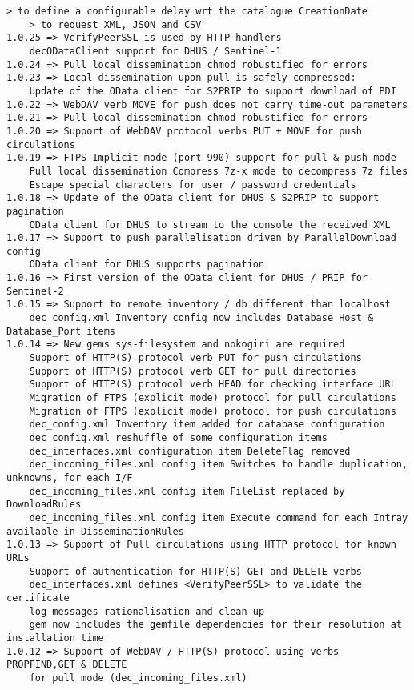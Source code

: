 \documentclass[dec_sum_main.tex]{subfiles}
\begin{document}
\begin{Verbatim}[tabsize=4]
    > to define a configurable delay wrt the catalogue CreationDate
    > to request XML, JSON and CSV
1.0.25 => VerifyPeerSSL is used by HTTP handlers
    decODataClient support for DHUS / Sentinel-1
1.0.24 => Pull local dissemination chmod robustified for errors
1.0.23 => Local dissemination upon pull is safely compressed:
    Update of the OData client for S2PRIP to support download of PDI
1.0.22 => WebDAV verb MOVE for push does not carry time-out parameters
1.0.21 => Pull local dissemination chmod robustified for errors
1.0.20 => Support of WebDAV protocol verbs PUT + MOVE for push circulations
1.0.19 => FTPS Implicit mode (port 990) support for pull & push mode
    Pull local dissemination Compress 7z-x mode to decompress 7z files
    Escape special characters for user / password credentials
1.0.18 => Update of the OData client for DHUS & S2PRIP to support pagination
    OData client for DHUS to stream to the console the received XML
1.0.17 => Support to push parallelisation driven by ParallelDownload config
    OData client for DHUS supports pagination
1.0.16 => First version of the OData client for DHUS / PRIP for Sentinel-2
1.0.15 => Support to remote inventory / db different than localhost
    dec_config.xml Inventory config now includes Database_Host & Database_Port items
1.0.14 => New gems sys-filesystem and nokogiri are required
    Support of HTTP(S) protocol verb PUT for push circulations
    Support of HTTP(S) protocol verb GET for pull directories
    Support of HTTP(S) protocol verb HEAD for checking interface URL
    Migration of FTPS (explicit mode) protocol for pull circulations
    Migration of FTPS (explicit mode) protocol for push circulations
    dec_config.xml Inventory item added for database configuration
    dec_config.xml reshuffle of some configuration items
    dec_interfaces.xml configuration item DeleteFlag removed
    dec_incoming_files.xml config item Switches to handle duplication, unknowns, for each I/F
    dec_incoming_files.xml config item FileList replaced by DownloadRules
    dec_incoming_files.xml config item Execute command for each Intray available in DisseminationRules
1.0.13 => Support of Pull circulations using HTTP protocol for known URLs
    Support of authentication for HTTP(S) GET and DELETE verbs
    dec_interfaces.xml defines <VerifyPeerSSL> to validate the certificate
    log messages rationalisation and clean-up
    gem now includes the gemfile dependencies for their resolution at installation time
1.0.12 => Support of WebDAV / HTTP(S) protocol using verbs PROPFIND,GET & DELETE
    for pull mode (dec_incoming_files.xml)

\end{Verbatim}
\end{document}
